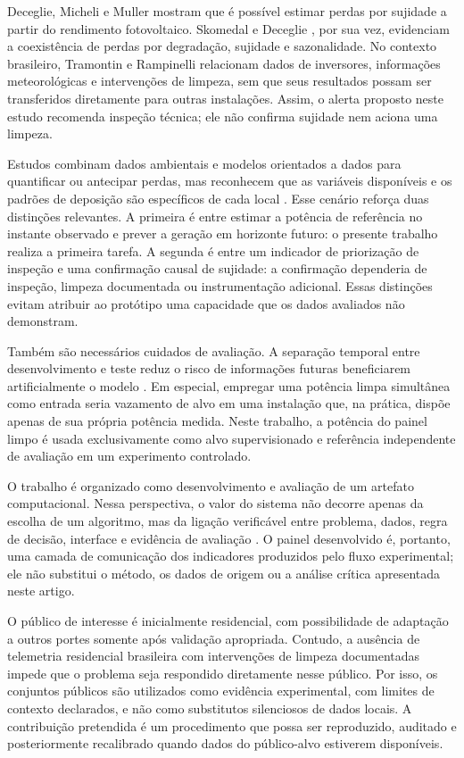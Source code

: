 \documentclass{UNESC}
\begin{document}
Deceglie, Micheli e Muller \cite{deceglie2018} mostram que é possível estimar perdas por sujidade a partir do rendimento fotovoltaico. Skomedal e Deceglie \cite{skomedal2020}, por sua vez, evidenciam a coexistência de perdas por degradação, sujidade e sazonalidade. No contexto brasileiro, Tramontin e Rampinelli \cite{Tramontin_Rampinelli_2024} relacionam dados de inversores, informações meteorológicas e intervenções de limpeza, sem que seus resultados possam ser transferidos diretamente para outras instalações. Assim, o alerta proposto neste estudo recomenda inspeção técnica; ele não confirma sujidade nem aciona uma limpeza.

Estudos combinam dados ambientais e modelos orientados a dados para quantificar ou antecipar perdas, mas reconhecem que as variáveis disponíveis e os padrões de deposição são específicos de cada local \cite{muller2020profiles,tsanakas2025}. Esse cenário reforça duas distinções relevantes. A primeira é entre estimar a potência de referência no instante observado e prever a geração em horizonte futuro: o presente trabalho realiza a primeira tarefa. A segunda é entre um indicador de priorização de inspeção e uma confirmação causal de sujidade: a confirmação dependeria de inspeção, limpeza documentada ou instrumentação adicional. Essas distinções evitam atribuir ao protótipo uma capacidade que os dados avaliados não demonstram.

Também são necessários cuidados de avaliação. A separação temporal entre desenvolvimento e teste reduz o risco de informações futuras beneficiarem artificialmente o modelo \cite{cerqueira2020,kapoor2023}. Em especial, empregar uma potência limpa simultânea como entrada seria vazamento de alvo em uma instalação que, na prática, dispõe apenas de sua própria potência medida. Neste trabalho, a potência do painel limpo é usada exclusivamente como alvo supervisionado e referência independente de avaliação em um experimento controlado.

O trabalho é organizado como desenvolvimento e avaliação de um artefato computacional. Nessa perspectiva, o valor do sistema não decorre apenas da escolha de um algoritmo, mas da ligação verificável entre problema, dados, regra de decisão, interface e evidência de avaliação \cite{hevner2004}. O painel desenvolvido é, portanto, uma camada de comunicação dos indicadores produzidos pelo fluxo experimental; ele não substitui o método, os dados de origem ou a análise crítica apresentada neste artigo.

O público de interesse é inicialmente residencial, com possibilidade de adaptação a outros portes somente após validação apropriada. Contudo, a ausência de telemetria residencial brasileira com intervenções de limpeza documentadas impede que o problema seja respondido diretamente nesse público. Por isso, os conjuntos públicos são utilizados como evidência experimental, com limites de contexto declarados, e não como substitutos silenciosos de dados locais. A contribuição pretendida é um procedimento que possa ser reproduzido, auditado e posteriormente recalibrado quando dados do público-alvo estiverem disponíveis.
\end{document}
